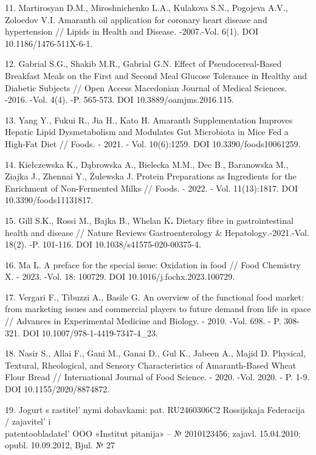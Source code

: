 \begin{references}
11. Martirosyan D.M., Miroshnichenko L.A., Kulakova S.N., Pogojeva A.V.,
Zoloedov V.I. Amaranth oil application for coronary heart disease and
hypertension // Lipids in Health and Disease\emph{.} -2007.-Vol. 6(1).
DOI 10.1186/1476-511X-6-1.

12. Gabrial S.G., Shakib M.R., Gabrial G.N. Effect of Pseudocereal-Based
Breakfast Meals on the First and Second Meal Glucose Tolerance in
Healthy and Diabetic Subjects // Open Access Macedonian Journal of
Medical Sciences. -2016. -Vol. 4(4). -P. 565-573.
DOI 10.3889/oamjms.2016.115.

13. Yang Y., Fukui R., Jia H., Kato H. Amaranth Supplementation Improves
Hepatic Lipid Dysmetabolism and Modulates Gut Microbiota in Mice Fed a
High-Fat Diet // Foods\emph{.} - 2021. - Vol. 10(6):1259. DOI
10.3390/foods10061259.

14. Kiełczewska K., Dąbrowska A., Bielecka M.M., Dec B., Baranowska M.,
Ziajka J., Zhennai Y., Żulewska J. Protein Preparations as Ingredients
for the Enrichment of Non-Fermented Milks // Foods. - 2022. - Vol.
11(13):1817. DOI 10.3390/foods11131817.

15. Gill S.K., Rossi M., Bajka B., Whelan K{\bfseries .} Dietary fibre in
gastrointestinal health and disease // Nature Reviews Gastroenterology
\& Hepatology\emph{.}-2021.-Vol. 18(2). -P. 101-116.
DOI 10.1038/s41575-020-00375-4.

16. Ma L. A preface for the special issue: Oxidation in food // Food
Chemistry X. - 2023. -Vol. 18: 100729. DOI 10.1016/j.fochx.2023.100729.

17. Vergari F., Tibuzzi A., Basile G. An overview of the functional food
market: from marketing issues and commercial players to future demand
from life in space // Advances in Experimental Medicine and Biology. -
2010. -Vol. 698. - P. 308-321. DOI 10.1007/978-1-4419-7347-4\_23.

18. Nasir S., Allai F., Gani M., Ganai D., Gul K., Jabeen A., Majid D.
Physical, Textural, Rheological, and Sensory Characteristics of
Amaranth-Based Wheat Flour Bread // International Journal of Food
Science. - 2020. -Vol. 2020. - P. 1-9. DOI 10.1155/2020/8874872.

19. Jogurt s rastitel' nymi dobavkami: pat. RU2460306C2
Rossijskaja Federacija / zajavitel'{} i\\
patentoobladatel'{} OOO «Institut pitanija» -- №
2010123456; zajavl. 15.04.2010; opubl. 10.09.2012, Bjul. № 27
\end{references}

